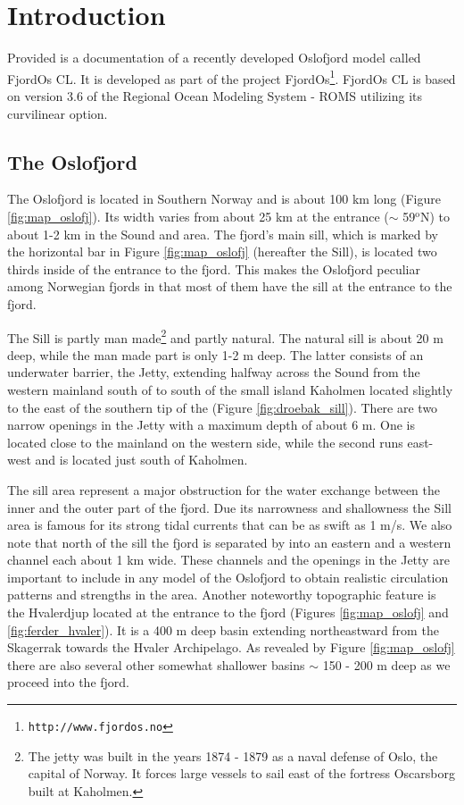 \section{Introduction}
\label{sec:intro}
Provided is a documentation of a recently developed Oslofjord model called FjordOs CL. It is developed as part of the project FjordOs\footnote{\texttt{http://www.fjordos.no}}. FjordOs CL is based on version 3.6 of the Regional Ocean Modeling System - ROMS \citep{haidv:etal:2008, shche:mcwil:2005, shche:mcwil:2009} utilizing its curvilinear option.

\subsection{The Oslofjord}
The Oslofjord is located in Southern Norway and is about 100 km long (Figure \ref{fig:map_oslofj}). Its width varies from about 25 km at the entrance ($\sim$ 59$^\text{o}$N) to about 1-2 km in the {\DR} Sound and {\DR} area. The fjord's main sill, which is marked by the horizontal bar in Figure \ref{fig:map_oslofj} (hereafter the {\DR} Sill), is located two thirds inside of the entrance to the fjord. This makes the Oslofjord peculiar among Norwegian fjords in that most of them have the sill at the entrance to the fjord. 


The {\DR} Sill is partly man made\footnote{The jetty was built in the years 1874 - 1879 as a naval defense of Oslo, the capital of Norway. It forces large vessels to sail east of the fortress Oscarsborg built at Kaholmen.} and partly natural. The natural sill is about 20 m deep, while the man made part is only 1-2 m deep. The latter consists of an underwater barrier, the {\DR} Jetty, extending halfway across the {\DR} Sound from the western mainland south of {\DR} to south of the small island Kaholmen located slightly to the east of the southern tip of the {\HAA} (Figure \ref{fig:droebak_sill}). There are two narrow openings in the Jetty with a maximum depth of about 6 m. One is located close to the mainland on the western side, while the second runs east-west and is located just south of Kaholmen.   
 

The sill area represent a major obstruction for the water exchange between the inner and the outer part of the fjord. Due its narrowness and shallowness the {\DR} Sill area is famous for its strong tidal currents that can be as swift as 1 m/s. We also note that north of the sill the fjord is separated by {\HAA} into an eastern and a western channel each about 1 km wide. These channels and the openings in the Jetty are important to include in any model of the Oslofjord to obtain realistic circulation patterns and strengths in the area. Another noteworthy topographic feature is the Hvalerdjup located at the entrance to the fjord (Figures \ref{fig:map_oslofj} and \ref{fig:ferder_hvaler}). It is a 400 m deep basin extending northeastward from the Skagerrak towards the Hvaler Archipelago. As revealed by Figure \ref{fig:map_oslofj} there are also several other somewhat shallower basins $\sim$ 150 - 200 m deep as we proceed into the fjord. 
 

